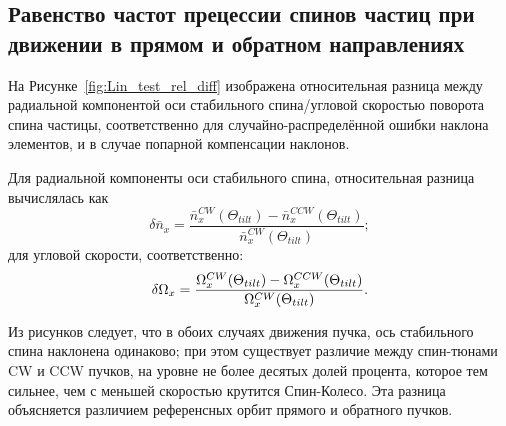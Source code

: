 \subsection{Равенство частот прецессии спинов частиц при движении в прямом и обратном направлениях}
На Рисунке~\ref{fig:Lin_test_rel_diff} изображена относительная разница между радиальной компонентой оси стабильного спина/угловой скоростью поворота спина частицы, соответственно для случайно-распределённой ошибки наклона элементов, и в случае попарной компенсации наклонов.

Для радиальной компоненты оси стабильного спина, относительная разница вычислялась как 
\[
\delta\bar n_x = \frac{\bar n_x^{CW}(\Theta_{tilt}) - \bar n_x^{CCW}(\Theta_{tilt})}{\bar n_x^{CW}(\Theta_{tilt})};
\]
для угловой скорости, соответственно:
\[
\delta\Omega_x = \frac{\Omega_x^{CW}(\Theta_{tilt}) - \Omega_x^{CCW}(\Theta_{tilt})}{\Omega_x^{CW}(\Theta_{tilt})}.
\]

Из рисунков следует, что в обоих случаях движения пучка, ось стабильного спина наклонена одинаково; при этом существует различие между спин-тюнами CW и CCW пучков, на уровне не более десятых долей процента, которое тем сильнее, чем с меньшей скоростью крутится Спин-Колесо. Эта разница объясняется различием референсных орбит прямого и обратного пучков. 

